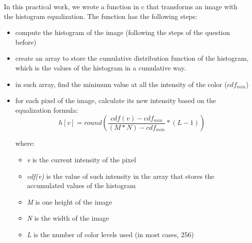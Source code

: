 \documentclass{article}
\begin{document}
	In this practical work, we wrote a function in c that transforms an image with the histogram equalization. The function has the following steps:
	\begin{itemize}
  		\item compute the histogram of the image (following the steps of the question before)
  		\item create an array to store the cumulative distribution function of the histogram, which is the values of the histogram in a cumulative way.
  		\item in such array, find the minimum value at all the intensity of the color ($cdf_{min}$)
  		\item for each pixel of the image, calculate its new intensity based on the equalization formula:
			\begin{equation}
				h[v]= round \left( \frac{cdf(v)-cdf_{min}}{(M * N) - cdf_{min}} * (L-1) \right) 
			\label{eq:equalization}
			\end{equation}
			
			where:		
			\begin{itemize}
	  			\item {\it v} is the current intensity of the pixel		
		  		\item {\it cdf(v)} is the value of such intensity in the array that stores the accumulated values of the histogram
		  		\item {\it M} is one height of the image		
		  		\item {\it N} is the width of the image
		  		\item {\it L} is the number of color levels used (in most cases, 256)
			\end{itemize}
	\end{itemize}
\end{document}

